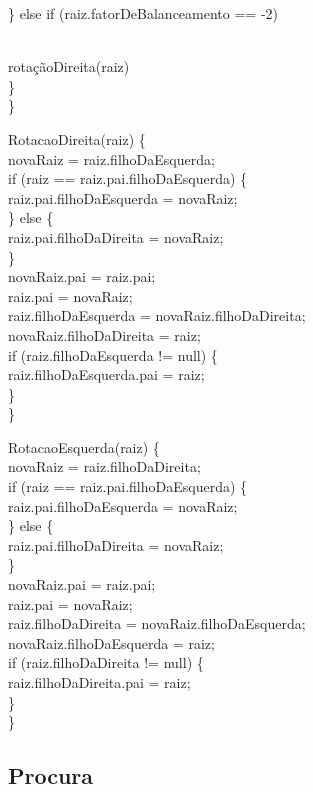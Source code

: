 \documentclass{article}
\begin{document}
\indent \} else if (raiz.fatorDeBalanceamento == -2) { \\
\indent\indent rotaçãoDireita(raiz) \\
\indent \} \\
\}

RotacaoDireita(raiz) \{ \\
\indent novaRaiz = raiz.filhoDaEsquerda; \\
\indent if (raiz == raiz.pai.filhoDaEsquerda) \{ \\
\indent\indent raiz.pai.filhoDaEsquerda = novaRaiz; \\
\indent \} else \{ \\
\indent\indent raiz.pai.filhoDaDireita = novaRaiz; \\
\indent \} \\ 
\indent novaRaiz.pai = raiz.pai; \\
\indent raiz.pai = novaRaiz; \\
\indent raiz.filhoDaEsquerda = novaRaiz.filhoDaDireita; \\
\indent novaRaiz.filhoDaDireita = raiz; \\
\indent if (raiz.filhoDaEsquerda != null) \{ \\
\indent\indent raiz.filhoDaEsquerda.pai = raiz; \\
\indent \} \\
\} 

RotacaoEsquerda(raiz) \{ \\
\indent novaRaiz = raiz.filhoDaDireita; \\
\indent if (raiz == raiz.pai.filhoDaEsquerda) \{ \\
\indent\indent raiz.pai.filhoDaEsquerda = novaRaiz; \\
\indent \} else \{ \\
\indent\indent raiz.pai.filhoDaDireita = novaRaiz; \\
\indent \} \\
\indent novaRaiz.pai = raiz.pai; \\ 
\indent raiz.pai = novaRaiz; \\
\indent raiz.filhoDaDireita = novaRaiz.filhoDaEsquerda; \\
\indent novaRaiz.filhoDaEsquerda = raiz; \\
\indent if (raiz.filhoDaDireita != null) \{ \\
\indent\indent raiz.filhoDaDireita.pai = raiz; \\
\indent    \} \\
\} \\
\subsection{Procura} 
}
\end{document}
